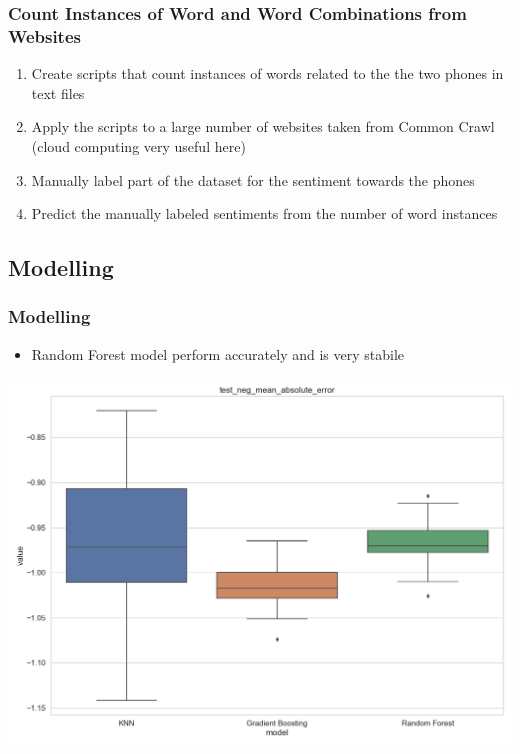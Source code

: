 \documentclass[10pt]{beamer}
\begin{document}
\begin{frame}
\frametitle{Count Instances of Word and Word Combinations from Websites}

\begin{enumerate}
    \item Create scripts that count instances of words related to the the two phones in text files
    \item Apply the scripts to a large number of websites taken from Common Crawl (cloud computing very useful here)
    \item Manually label part of the dataset for the sentiment towards the phones
    \item Predict the manually labeled sentiments from the number of word instances
\end{enumerate}


\end{frame}

\subsection{Modelling}

\begin{frame}
\frametitle{Modelling}

\begin{itemize}
    \item Random Forest model perform accurately and is very stabile
\end{itemize}

{
    \centering
    \includegraphics[width=\textwidth,height=0.8\textheight,keepaspectratio]{model_comparison_iphone_test_neg_mean_absolute_error.png}
    \par
}

\end{frame}
\end{document}

